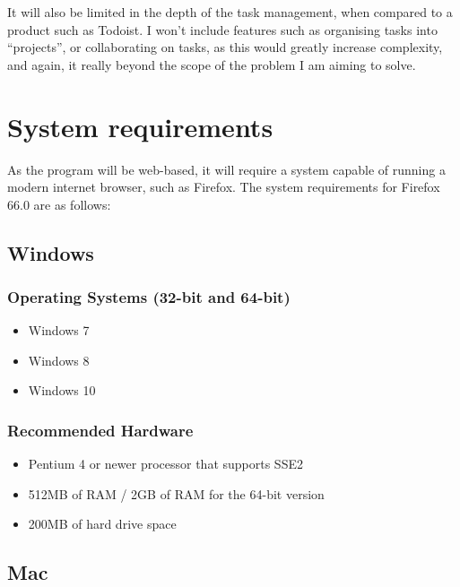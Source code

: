 \documentclass{article}
\begin{document}
It will also be limited in the depth of the task management,
when compared to a product such as Todoist.
I won't include features such as organising tasks into ``projects'',
or collaborating on tasks,
as this would greatly increase complexity,
and again,
it really beyond the scope of the problem I am aiming to solve.


\section{System requirements}
As the program will be web-based, it will require a system capable of running a
modern internet browser, such as Firefox. The system requirements for Firefox
66.0 are as follows:

\subsection*{Windows}\label{windows}

\subsubsection*{Operating Systems (32-bit and
	64-bit)}\label{operating-systems-32-bit-and-64-bit}

\begin{samepage}
	\begin{itemize}
		\item Windows 7
		\item Windows 8
		\item Windows 10
	\end{itemize}
\end{samepage}

\subsubsection*{Recommended Hardware}\label{recommended-hardware}

\begin{samepage}
	\begin{itemize}
		\item Pentium 4 or newer processor that supports SSE2
		\item 512MB of RAM / 2GB of RAM for the 64-bit version
		\item 200MB of hard drive space
	\end{itemize}
\end{samepage}

\subsection*{Mac}\label{mac}
\end{document}
